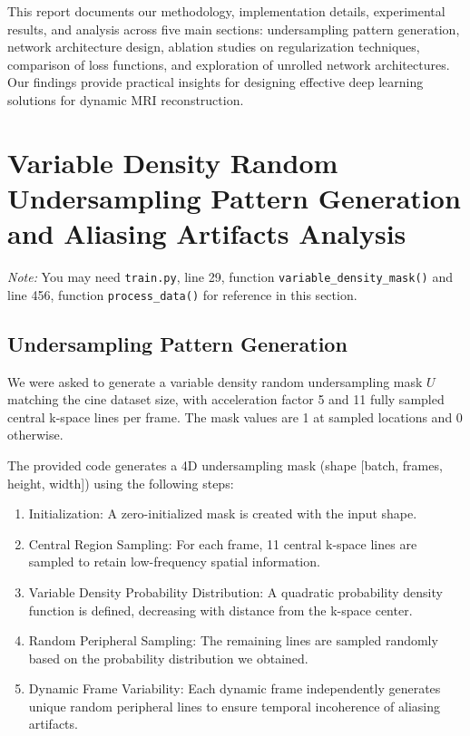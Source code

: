 \documentclass{article}
\begin{document}
This report documents our methodology, implementation details, experimental results, and analysis across five main sections: undersampling pattern generation, network architecture design, ablation studies on regularization techniques, comparison of loss functions, and exploration of unrolled network architectures. Our findings provide practical insights for designing effective deep learning solutions for dynamic MRI reconstruction.


\section{Variable Density Random Undersampling Pattern Generation and Aliasing Artifacts Analysis}
\textit{Note: }You may need \texttt{train.py}, line 29, function \texttt{variable\_density\_mask()}
and line 456, function \texttt{process\_data()} for reference in this section.

\subsection{Undersampling Pattern Generation}
We were asked to generate a variable density random undersampling mask $U$ matching the cine
dataset size, with acceleration factor 5 and 11 fully sampled central k-space lines per frame.
The mask values are 1 at sampled locations and 0 otherwise.

The provided code generates a 4D undersampling mask (shape [batch, frames, height, width]) using the following steps:
\begin{enumerate}
  \item Initialization: A zero-initialized mask is created with the input shape.
  \item Central Region Sampling: For each frame, 11 central k-space lines are
        sampled to retain low-frequency spatial information.
  \item Variable Density Probability Distribution: A quadratic probability density
        function is defined, decreasing with distance from the k-space center.
  \item Random Peripheral Sampling: The remaining lines are sampled randomly
        based on the probability distribution we obtained.
  \item Dynamic Frame Variability: Each dynamic frame independently generates
        unique random peripheral lines to ensure temporal incoherence of aliasing artifacts.
\end{enumerate}
\end{document}
